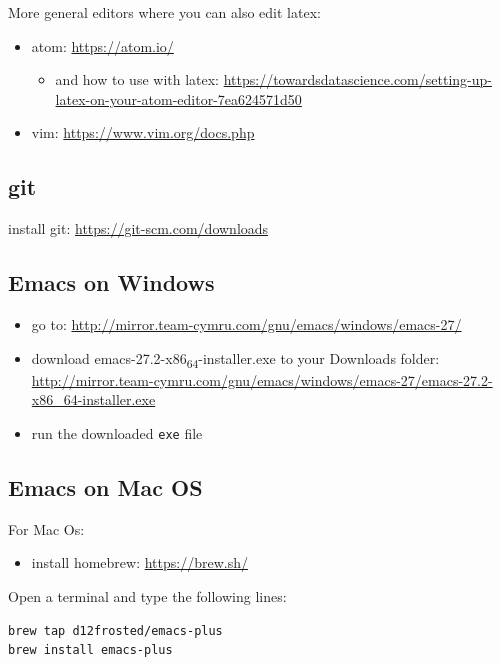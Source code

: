 \documentclass[11pt]{article}
\begin{document}
More general editors where you can also edit latex:

\begin{itemize}
\item atom: \url{https://atom.io/}
\begin{itemize}
\item and how to use with latex: \url{https://towardsdatascience.com/setting-up-latex-on-your-atom-editor-7ea624571d50}
\end{itemize}
\item vim: \url{https://www.vim.org/docs.php}
\end{itemize}



\subsection{git}
\label{sec:orgb0cccdd}

install git: \url{https://git-scm.com/downloads}

\subsection{Emacs on Windows}
\label{sec:org8ef348d}

\begin{itemize}
\item go to: \url{http://mirror.team-cymru.com/gnu/emacs/windows/emacs-27/}
\item download emacs-27.2-x86\textsubscript{64}-installer.exe to your Downloads folder: \url{http://mirror.team-cymru.com/gnu/emacs/windows/emacs-27/emacs-27.2-x86\_64-installer.exe}
\item run the downloaded \texttt{exe} file
\end{itemize}

\subsection{Emacs on Mac OS}
\label{sec:org091dc2d}

For Mac Os:
\begin{itemize}
\item install homebrew: \url{https://brew.sh/}
\end{itemize}

Open a terminal and type the following lines:

\begin{verbatim}
brew tap d12frosted/emacs-plus
brew install emacs-plus
\end{verbatim}
\end{document}
